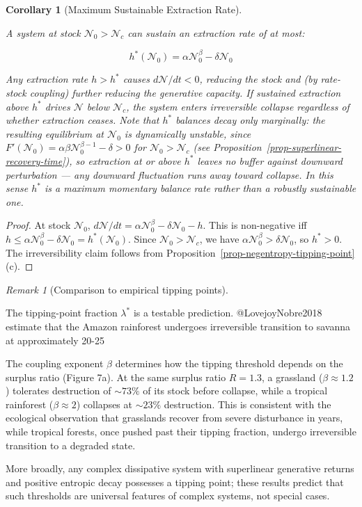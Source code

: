 \documentclass[11pt]{article}
\theoremstyle{plain}
\newtheorem{corollary}[theorem]{Corollary}
\theoremstyle{definition}
\theoremstyle{remark}
\newtheorem{remark}{Remark}
\begin{document}
\begin{corollary}[Maximum Sustainable Extraction Rate]
\label{cor-maximum-sustainable-extraction}

A system at stock $\mathcal{N}_0 > \mathcal{N}_c$ can sustain an extraction rate of at most:

$$h^*(\mathcal{N}_0) = \alpha\mathcal{N}_0^\beta - \delta\mathcal{N}_0$$

Any extraction rate $h > h^*$ causes $d\mathcal{N}/dt < 0$, reducing the stock and (by rate-stock coupling) further reducing the generative capacity. If sustained extraction above $h^*$ drives $\mathcal{N}$ below $\mathcal{N}_c$, the system enters irreversible collapse regardless of whether extraction ceases. Note that $h^*$ balances decay only marginally: the resulting equilibrium at $\mathcal{N}_0$ is dynamically unstable, since $F'(\mathcal{N}_0) = \alpha\beta\mathcal{N}_0^{\beta-1} - \delta > 0$ for $\mathcal{N}_0 > \mathcal{N}_c$ (see Proposition~\ref{prop-superlinear-recovery-time}), so extraction at or above $h^*$ leaves no buffer against downward perturbation — any downward fluctuation runs away toward collapse. In this sense $h^*$ is a maximum \emph{momentary} balance rate rather than a robustly sustainable one.
\end{corollary}

\begin{proof}
At stock $\mathcal{N}_0$, $d\mathcal{N}/dt = \alpha\mathcal{N}_0^\beta - \delta\mathcal{N}_0 - h$. This is non-negative iff $h \leq \alpha\mathcal{N}_0^\beta - \delta\mathcal{N}_0 = h^*(\mathcal{N}_0)$. Since $\mathcal{N}_0 > \mathcal{N}_c$, we have $\alpha\mathcal{N}_0^\beta > \delta\mathcal{N}_0$, so $h^* > 0$. The irreversibility claim follows from Proposition~\ref{prop-negentropy-tipping-point}(c).
\end{proof}

\begin{remark}[Comparison to empirical tipping points]
\label{rem-empirical-tipping-points}

The tipping-point fraction $\lambda^*$ is a testable prediction. @LovejoyNobre2018 estimate that the Amazon rainforest undergoes irreversible transition to savanna at approximately 20-25%

The coupling exponent $\beta$ determines how the tipping threshold depends on the surplus ratio (Figure 7a). At the same surplus ratio $R = 1.3$, a grassland ($\beta \approx 1.2$) tolerates destruction of $\sim73\%$ of its stock before collapse, while a tropical rainforest ($\beta \approx 2$) collapses at $\sim23\%$ destruction. This is consistent with the ecological observation that grasslands recover from severe disturbance in years, while tropical forests, once pushed past their tipping fraction, undergo irreversible transition to a degraded state.

More broadly, any complex dissipative system with superlinear generative returns and positive entropic decay possesses a tipping point; these results predict that such thresholds are universal features of complex systems, not special cases.
\end{remark}
\end{document}
